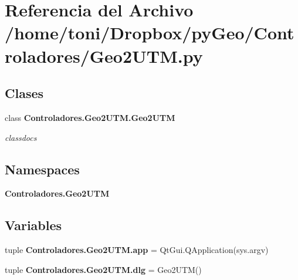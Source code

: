 \section{Referencia del Archivo /home/toni/\-Dropbox/py\-Geo/\-Controladores/\-Geo2\-U\-T\-M.py}
\label{Controladores_2Geo2UTM_8py}
\subsection*{Clases}
\begin{DoxyCompactItemize}
\item 
class {\bf Controladores.\-Geo2\-U\-T\-M.\-Geo2\-U\-T\-M}
\begin{DoxyCompactList}\small\item\em classdocs \end{DoxyCompactList}\end{DoxyCompactItemize}
\subsection*{Namespaces}
\begin{DoxyCompactItemize}
\item 
{\bf Controladores.\-Geo2\-U\-T\-M}
\end{DoxyCompactItemize}
\subsection*{Variables}
\begin{DoxyCompactItemize}
\item 
tuple {\bf Controladores.\-Geo2\-U\-T\-M.\-app} = Qt\-Gui.\-Q\-Application(sys.\-argv)
\item 
tuple {\bf Controladores.\-Geo2\-U\-T\-M.\-dlg} = Geo2\-U\-T\-M()
\end{DoxyCompactItemize}
